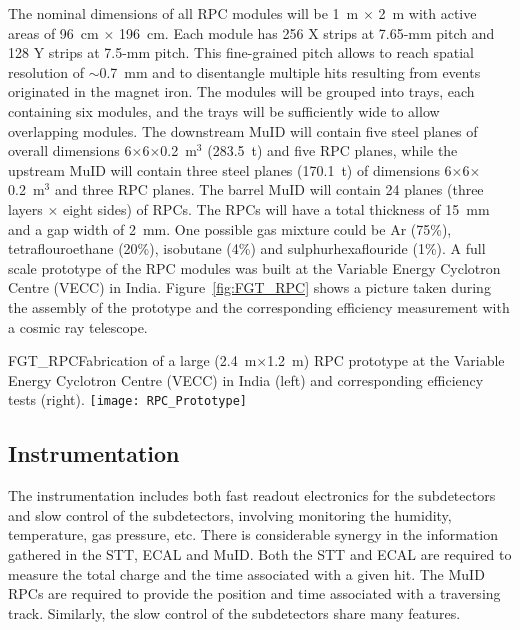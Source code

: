 The nominal dimensions of all RPC modules will be 1~m $\times$ 2~m
with active areas of 96~cm $\times$ 196~cm. Each module has 256 X
strips at 7.65-mm pitch and 128 Y strips at 7.5-mm pitch. This
fine-grained pitch allows to reach spatial resolution of $\sim$0.7~mm
and to disentangle multiple hits resulting from events originated in
the magnet iron.  The modules will be grouped into trays, each
containing six modules, and the trays will be sufficiently wide to
allow overlapping modules.  The downstream MuID will contain five
steel planes of overall dimensions 6$\times$6$\times$0.2~m$^3$
(283.5~t) and five RPC planes, while the upstream MuID will contain
three steel planes (170.1~t) of dimensions 6$\times$6$\times$0.2~m$^3$
and three RPC planes. The barrel MuID will contain 24 planes (three
layers $\times$ eight sides) of RPCs. The RPCs will have a total
thickness of 15~mm and a gap width of 2~mm. One possible gas mixture
could be Ar (75\%), tetraflouroethane (20\%), isobutane (4\%) and
sulphurhexaflouride (1\%).  A full scale prototype of the RPC modules
was built at the Variable Energy Cyclotron Centre (VECC) in India.
Figure~\ref{fig:FGT_RPC} shows a picture taken during the assembly of
the prototype and the corresponding efficiency measurement with a
cosmic ray telescope.
\begin{cdrfigure}{FGT_RPC}{Fabrication of a large 
(2.4~m$\times$1.2~m) RPC prototype at the Variable Energy Cyclotron Centre (VECC) in India 
(left) and corresponding efficiency tests (right).}
\texttt{[image: RPC\_Prototype]} %
\end{cdrfigure}



\subsection{Instrumentation}
\label{cdrsec:detectors-nd-ref-fgt-instrum}

The instrumentation includes both fast readout electronics for the
subdetectors and slow control of the subdetectors, involving
monitoring the humidity, temperature, gas pressure, etc.  There is
considerable synergy in the information gathered in the STT, ECAL and
MuID.  Both the STT and ECAL are required to measure the total charge
and the time associated with a given hit. The MuID RPCs are required
to provide the position and time associated with a traversing
track. Similarly, the slow control of the subdetectors share many
features.

